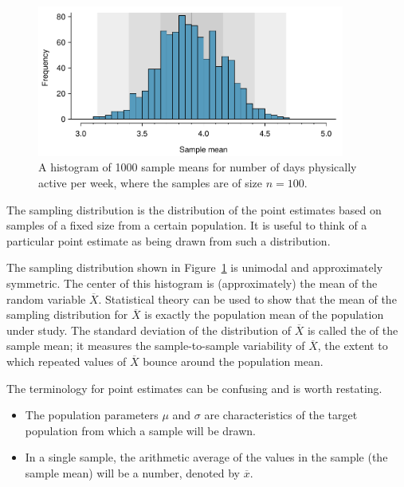 \begin{spacing}{1.5}
\begin{figure}[h]
   \centering
   \includegraphics[width=0.9\textwidth]
{ch_inference_foundations_oi_biostat/figures/yrbssActive1000SampDist/yrbssActive1000SampDist}
   \caption{A histogram of 1000 sample means for number of days physically active per week, where the samples are of size $n=100$.}
   \label{yrbssActive1000SampDist}
\end{figure}

\begin{termBox}{
The sampling distribution is the distribution of the point estimates based on samples of a fixed size from a certain population. It is useful to think of a particular point estimate as being drawn from such a distribution.}
\end{termBox}

The sampling distribution shown in Figure~\ref{yrbssActive1000SampDist} is unimodal and approximately symmetric.  The center of this histogram is (approximately) the mean of the random variable $\overline{X}$.  Statistical theory can be used to show that the mean of the sampling distribution for $\overline{X}$ is exactly the population mean of the population under study. The standard deviation of the distribution of $\overline{X}$ is called the  of the sample mean; it measures the sample-to-sample variability of $\overline{X}$, the extent to which repeated values of $\overline{X}$ bounce around the population mean.

The terminology for point estimates can be confusing and is worth restating.  

\begin{itemize}
	
  \item The population parameters $\mu$ and $\sigma$ are characteristics of the target population from which a sample will be drawn.  
  
  \item In a single sample, the arithmetic average of the values in the sample (the sample mean) will be a number, denoted by $\overline{x}$.  
  

\end{itemize}
\end{spacing}
